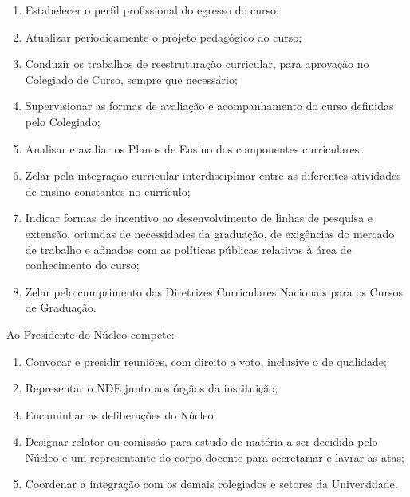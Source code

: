 \documentclass[
	12pt,				%
	openright,			%
  oneside,     %
	a4paper,			%
 hyphens,
	chapter=TITLE,		%
	english,			%
	french,				%
	spanish,			%
	brazil				%
	]{abntex2}
\begin{document}
\begin{enumerate}
    \item Estabelecer o perfil profissional do egresso do curso; 	
    \item Atualizar periodicamente o projeto pedagógico do curso; 	
    \item Conduzir os trabalhos de reestruturação curricular, para aprovação no Colegiado de Curso, sempre que necessário;
    \item Supervisionar as formas de avaliação e acompanhamento do curso definidas pelo Colegiado; 	
    \item Analisar e avaliar os Planos de Ensino dos componentes curriculares;
    \item Zelar pela integração curricular interdisciplinar entre as diferentes atividades de ensino constantes no currículo; 	
    \item Indicar formas de incentivo ao desenvolvimento de linhas de pesquisa e extensão, oriundas de necessidades da graduação, de exigências do mercado de trabalho e afinadas com as políticas públicas relativas à área de conhecimento do curso; 	
    \item Zelar pelo cumprimento das Diretrizes Curriculares Nacionais para os Cursos de Graduação.
\end{enumerate}

Ao Presidente do Núcleo compete:

\begin{enumerate}
    \item Convocar e presidir reuniões, com direito a voto, inclusive o de qualidade;
    \item Representar o NDE junto aos 	órgãos da instituição; 	
    \item Encaminhar as deliberações do Núcleo; 	
    \item Designar relator ou comissão 	para estudo de matéria a ser decidida pelo Núcleo e um representante do corpo docente para secretariar e lavrar as atas;
    \item Coordenar a integração com os demais colegiados e setores da Universidade.
\end{enumerate}



%
%


\end{document}
